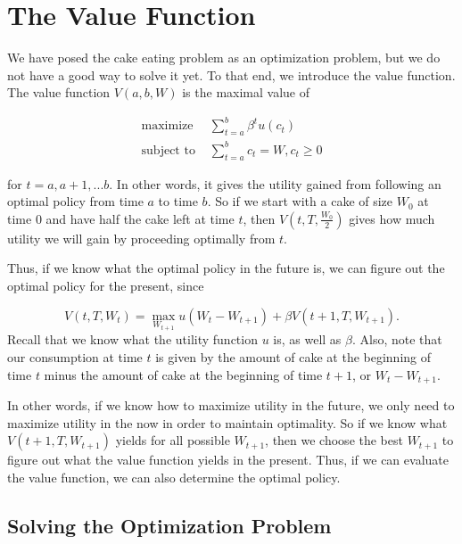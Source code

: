 \section*{The Value Function}

We have posed the cake eating problem as an optimization problem, but we do not have a good way to solve it yet.
To that end, we introduce the value function.
The value function  $V(a,b,W)$ is the maximal value of

\begin{align*}
\mbox{maximize } & \sum_{t=a}^b \beta^tu(c_t) \\
\mbox{subject to } & \sum_{t=a}^b c_t = W, c_t \geq 0
\end{align*}

for $t = a, a+1, ... b$.
In other words, it gives the utility gained from following an optimal policy from time $a$ to time $b$.  
So if we start with a cake of size $W_0$ at time $0$ and have half the cake left at time $t$, then $V(t, T, \frac{W_0}{2})$ gives how much utility we will gain by proceeding optimally from $t$.

Thus, if we know what the optimal policy in the future is, we can figure out the optimal policy for the present, since

\[
V(t, T, W_{t}) = \max_{W_{t+1}} u(W_{t} - W_{t+1}) + \beta V(t+1, T, W_{t+1}).
\]
Recall that we know what the utility function $u$ is, as well as $\beta$.
Also, note that our consumption at time $t$ is given by the amount of cake at the beginning of time $t$ minus the amount of cake at the beginning of time $t+1$, or $W_t - W_{t+1}$.

In other words, if we know how to maximize utility in the future, we only need to maximize utility in the now in order to maintain optimality.
So if we know what $V(t+1, T, W_{t+1})$ yields for all possible $W_{t+1}$, then we choose the best $W_{t+1}$ to figure out what the value function yields in the present.
Thus, if we can evaluate the value function, we can also determine the optimal policy.

\subsection*{Solving the Optimization Problem}

